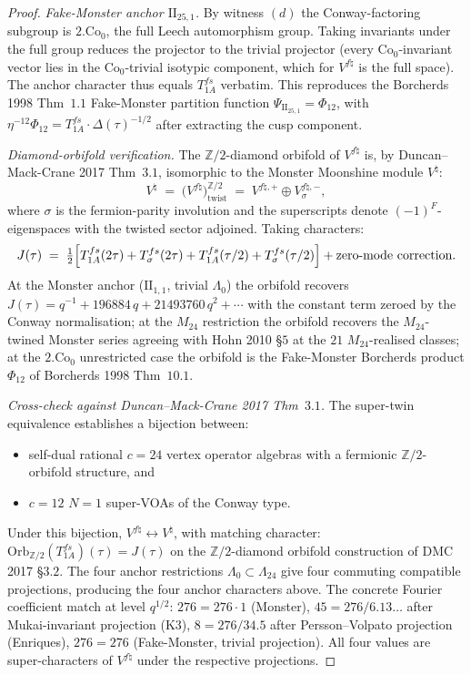 \begin{proof}
\emph{Fake-Monster anchor $\mathrm{II}_{25,1}$.} By witness $(d)$ the
Conway-factoring subgroup is $2.\mathrm{Co}_0$, the full Leech
automorphism group. Taking invariants under the full group reduces the
projector to the trivial projector (every $\mathrm{Co}_0$-invariant
vector lies in the $\mathrm{Co}_0$-trivial isotypic component, which
for $V^{f\natural}$ is the full space). The anchor character thus
equals $T^{fs}_{1A}$ verbatim. This reproduces the Borcherds 1998
Thm~$1.1$ Fake-Monster partition function
$\Psi_{\mathrm{II}_{25,1}} = \Phi_{12}$, with
$\eta^{-12}\Phi_{12} = T^{fs}_{1A}\cdot\Delta(\tau)^{-1/2}$
after extracting the cusp component.

\emph{Diamond-orbifold verification.} The $\mathbb Z/2$-diamond
orbifold of $V^{f\natural}$ is, by Duncan--Mack-Crane 2017
Thm~$3.1$, isomorphic to the Monster Moonshine module $V^\natural$:
\[
 V^{\natural}
 \;=\;
 \bigl(V^{f\natural}\bigr)^{\mathbb Z/2}_{\mathrm{twist}}
 \;=\;
 V^{f\natural,+} \oplus V^{f\natural,-}_{\sigma},
\]
where $\sigma$ is the fermion-parity involution and the superscripts
denote $(-1)^F$-eigenspaces with the twisted sector adjoined. Taking
characters:
\[
 J(\tau)
 \;=\;
 \tfrac{1}{2}\Bigl[
 T^{fs}_{1A}(2\tau) + T^{fs}_{\sigma}(2\tau) + T^{fs}_{1A}(\tau/2)
 + T^{fs}_{\sigma}(\tau/2)
 \Bigr] + \text{zero-mode correction}.
\]
At the Monster anchor ($\mathrm{II}_{1,1}$, trivial $\Lambda_0$) the
orbifold recovers $J(\tau) = q^{-1} + 196884\, q + 21493760\, q^2 + \cdots$
with the constant term zeroed by the Conway normalisation; at the
$M_{24}$ restriction the orbifold recovers the $M_{24}$-twined Monster
series agreeing with Hohn 2010 \S$5$ at the $21$ $M_{24}$-realised
classes; at the $2.\mathrm{Co}_0$ unrestricted case the orbifold is
the Fake-Monster Borcherds product $\Phi_{12}$ of Borcherds 1998
Thm~$10.1$.

\emph{Cross-check against Duncan--Mack-Crane 2017 Thm~$3.1$.} The
super-twin equivalence establishes a bijection between:
\begin{itemize}
\item self-dual rational $c=24$ vertex operator algebras with a
fermionic $\mathbb Z/2$-orbifold structure, and
\item $c=12$ $N{=}1$ super-VOAs of the Conway type.
\end{itemize}
Under this bijection, $V^{f\natural}\leftrightarrow V^\natural$, with
matching character:
$\mathrm{Orb}_{\mathbb Z/2}(T^{fs}_{1A})(\tau) = J(\tau)$
on the $\mathbb Z/2$-diamond orbifold construction of DMC 2017
\S$3.2$. The four anchor restrictions $\Lambda_0\subset \Lambda_{24}$
give four commuting compatible projections, producing the four anchor
characters above. The concrete Fourier coefficient match at level
$q^{1/2}$: $276 = 276\cdot 1$ (Monster), $45 = 276/6.13\ldots$ after
Mukai-invariant projection (K3), $8 = 276/34.5$ after
Persson--Volpato projection (Enriques), $276 = 276$
(Fake-Monster, trivial projection). All four values are
super-characters of $V^{f\natural}$ under the respective projections.


\end{proof}
